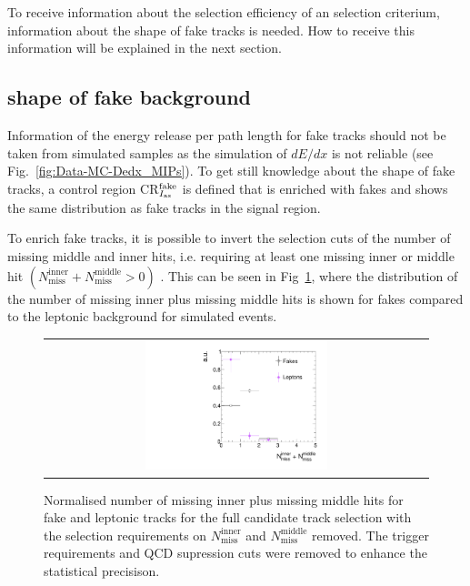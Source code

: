 To receive information about the selection efficiency of an \ias selection criterium, information about the \ias shape of fake tracks is needed.
How to receive this information will be explained in the next section.
\subsection*{\ias shape of fake background}
Information of the energy release per path length for fake tracks should not be taken from simulated samples as the simulation of $dE/dx$ is not reliable (see Fig.~\ref{fig:Data-MC-Dedx_MIPs}).
To get still knowledge about the \ias shape of fake tracks, a control region CR$_{I_{\text{as}}}^{\text{fake}}$ is defined that is enriched with fakes and shows the same \ias distribution as fake tracks in the signal region.

To enrich fake tracks, it is possible to invert the selection cuts of the number of missing middle and inner hits, i.e. requiring at least one missing inner or middle hit $\left( N_{\text{miss}}^{\text{inner}} +N_{\text{miss}}^{\text{middle}}>0\right)$ .
This can be seen in Fig~\ref{fig:NMissInnerAndMiddle}, where the distribution of the number of missing inner plus missing middle hits is shown for fakes compared to the leptonic background for simulated \WJets events.
\begin{figure}[!b]
  \centering 
  \begin{tabular}{c}
    \includegraphics[width=0.49\textwidth]{figures/analysis/Background/NLostInnerPlusMiddleForAllBkg_chiTracksQCDsupressionTrigger.pdf}
  \end{tabular}
  \caption{Normalised number of missing inner plus missing middle hits for fake and leptonic tracks for the full candidate track selection with the selection requirements on $N_{\text{miss}}^{\text{inner}}$ and $N_{\text{miss}}^{\text{middle}}$ removed. The trigger requirements and QCD supression cuts were removed to enhance the statistical precisison.}
  \label{fig:NMissInnerAndMiddle}
\end{figure}

